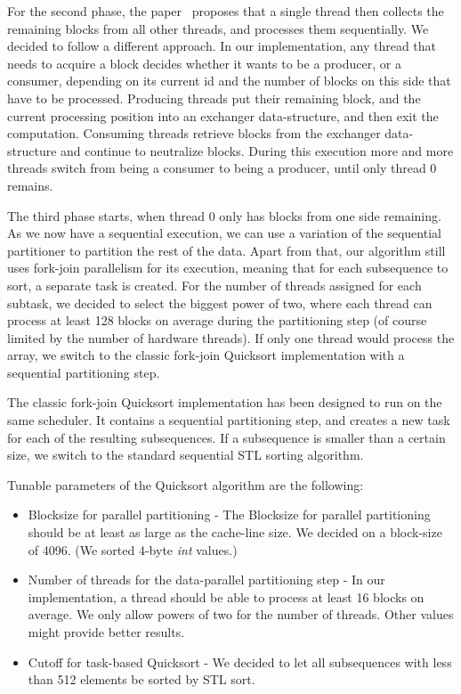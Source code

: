 \documentclass[preprint]{sigplanconf}
\begin{document}
For the second phase, the paper~\cite{TsigasZhang03} proposes that a
single thread then collects the remaining blocks from all other
threads, and processes them sequentially. We decided to follow a
different approach. In our implementation, any thread that needs to
acquire a block decides whether it wants to be a producer, or a
consumer, depending on its current id and the number of blocks on this
side that have to be processed. Producing threads put their remaining
block, and the current processing position into an exchanger
data-structure, and then exit the computation. Consuming threads
retrieve blocks from the exchanger data-structure and continue to
neutralize blocks. During this execution more and more threads switch
from being a consumer to being a producer, until only thread 0
remains.

The third phase starts, when thread 0 only has blocks from one side
remaining. As we now have a sequential execution, we can use a
variation of the sequential partitioner to partition the rest of the
data. Apart from that, our algorithm still uses fork-join parallelism
for its execution, meaning that for each subsequence to sort, a
separate task is created. For the number of threads assigned for each
subtask, we decided to select the biggest power of two, where each
thread can process at least 128 blocks on average during the
partitioning step (of course limited by the number of hardware
threads). If only one thread would process the array, we switch to the
classic fork-join Quicksort implementation with a sequential
partitioning step.

The classic fork-join Quicksort implementation has been designed to
run on the same scheduler. It contains a sequential partitioning step,
and creates a new task for each of the resulting subsequences. If a
subsequence is smaller than a certain size, we switch to the standard
sequential STL sorting algorithm.

Tunable parameters of the Quicksort algorithm are the following:

\begin{itemize}
\item 
Blocksize for parallel partitioning - The Blocksize for parallel
partitioning should be at least as large as the cache-line size. We
decided on a block-size of 4096. (We sorted 4-byte \emph{int} values.)
\item 
Number of threads for the data-parallel partitioning step - In
our implementation, a thread should be able to process at least 16
blocks on average. We only allow powers of two for the number of
threads. Other values might provide better results.
\item 
Cutoff for task-based Quicksort - We decided to let all
subsequences with less than 512 elements be sorted by STL sort.
\end{itemize}
\end{document}
